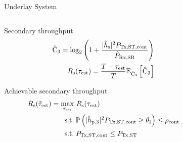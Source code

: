 \documentclass[16pt]{beamer}
\newcommand{\fs}[2]{\fontsize{#1 pt}{#2}\selectfont}
\begin{document}
\begin{frame}[t]{Underlay System}
	\fs{7}{8}
	\begin{columns}
		\begin{column}{0.45\columnwidth}
			\begin{block}{\scriptsize Secondary throughput} %
			\vspace{-3mm}
			\begin{align*}
				\hat{\text{{C}}}_{\text{3}}  = \log_2 \left(1 + \frac{|\hat{h}_{\text{s}}|^2 P_{\text{Tx,ST,cont}}}{\hat{P}_{\text{Rx,SR}}} \right) \\
				R_{\text{s}}(\tau_{\text{est}}) = \frac{T - \tau_{\text{est}}}{T} {\mathbb E}_{\hat{\text{{C}}}_{\text{3}}}\left[ \hat{\text{{C}}}_{\text{3}} \right] 
			\end{align*}
			\end{block}

			\begin{block}{\scriptsize Achievable secondary throughput} 
			\vspace{-3mm}
			\begin{align*}
				R_{\text{s}}(\tilde{\tau}_{\text{est}})  = \operatorname*{max}_{\tau_{\text{est}}}  & \text{      } {R_{\text{s}}(\tau_{\text{est}})} \\
				\text{s.t.} & \;\mathbb P\left( |\hat{h}_{\text{p,3}}|^2 P_{\text{Tx,ST,cont}} \ge \theta_{\text{I}} \right) \le \rho_{\text{cont}} \\
				\text{s.t.} & \;P_{\text{Tx,ST,cont}} \le P_{\text{Tx,ST}}
			\end{align*}
			\end{block}
		\end{column}
		\begin{column}{0.55\columnwidth}
		\fs{7}{8}
		\begin{center}
			\centering
\end{center}
\end{column}
\end{columns}
\end{frame}
\end{document}
